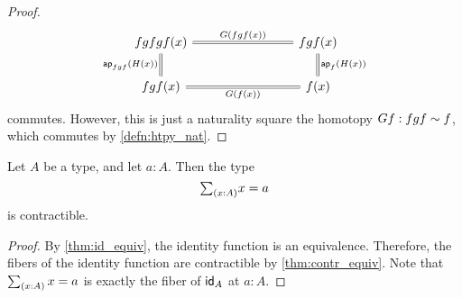 \begin{proof}
\begin{equation*}
\begin{tikzcd}[column sep=8em]
fgfgf(x) \arrow[r,equals,"G(fgf(x))"] \arrow[d,equals,swap,"\ap{fgf}{H(x)}"] & fgf(x) \arrow[d,equals,"\ap{f}{H(x)}"] \\
fgf(x) \arrow[r,equals,swap,"G(f(x))"] & f(x)
\end{tikzcd}
\end{equation*}
commutes. However, this is just a naturality square the homotopy $Gf:fgf\htpy f$, which commutes by \autoref{defn:htpy_nat}.
\end{proof}

\begin{cor}\label{cor:contr_path}
Let $A$ be a type, and let $a:A$. Then the type
\begin{equation*}
\sm{x:A}x=a
\end{equation*}
is contractible.
\end{cor}

\begin{proof}
By \autoref{thm:id_equiv}, the identity function is an equivalence. Therefore, the fibers of the identity function are contractible by \autoref{thm:contr_equiv}. Note that $\sm{x:A}x=a$ is exactly the fiber of $\idfunc[A]$ at $a:A$.
\end{proof}

\begin{comment}
\begin{proof}
We have the term $(a,\refl{a}):\sm{x:A}a=x$, which we take for the center of contraction. To construct the contraction, we have to show that
\begin{equation*}
\prd{p:\sm{x:A}a=x} (a,\refl{a})=p.
\end{equation*}
By the induction principle for dependent pair types it suffices to construct a term of type
\begin{equation*}
\prd{x:A}{p:a=x} (a,\refl{a})=(x,p)
\end{equation*}
Note that we may proceed here by path induction on $p$. That is, it suffices to consider the case $p\jdeq\refl{a}$, and show that $(a,\refl{a})=(a,\refl{a})$. Here we choose $\refl{(a,\refl{a})}$.
\end{proof}
\end{comment}

